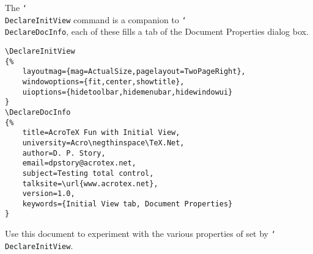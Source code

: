 \documentclass{article}
\newcommand{\cs}[1]{\texttt{\char`\\#1}}
\begin{document}
\maketitle

\noindent The \cs{DeclareInitView} command is a companion to
\cs{DeclareDocInfo}, each of these fills a tab of the
\textsf{Document Properties} dialog box.

\begin{verbatim}
\DeclareInitView
{%
    layoutmag={mag=ActualSize,pagelayout=TwoPageRight},
    windowoptions={fit,center,showtitle},
    uioptions={hidetoolbar,hidemenubar,hidewindowui}
}
\DeclareDocInfo
{%
    title=AcroTeX Fun with Initial View,
    university=Acro\negthinspace\TeX.Net,
    author=D. P. Story,
    email=dpstory@acrotex.net,
    subject=Testing total control,
    talksite=\url{www.acrotex.net},
    version=1.0,
    keywords={Initial View tab, Document Properties}
}
\end{verbatim}

\noindent Use this document to experiment with the various
properties of set by \cs{DeclareInitView}.

\newpage
\end{document}
